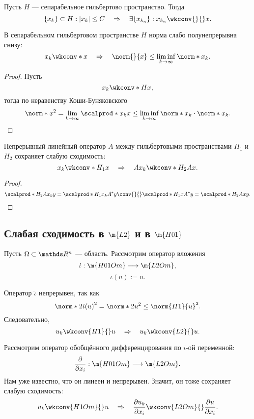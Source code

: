\begin{note} Пусть $H$ --- сепарабельное гильбертово пространство. Тогда
$$ \{ x_k \} \subset H : |x_k| \leq C \quad \Rightarrow \quad \exists \{ x_{k_n} \} : x_{k_n} \wkconv{}{} x.$$
\end{note}

\begin{note} В сепарабельном гильбертовом пространстве $H$ норма слабо полунепрерывна снизу:
$$x_k \wkconv*{}{} x \quad \Rightarrow \quad \norm{}{x} \leq \liminf_{k \to \infty} \norm*{}{x_k}.$$
\end{note}
\begin{proof}
Пусть 
$$ x_k \wkconv*{H}{} x,$$
тогда по неравенству Коши-Буняковского
$$ \norm*{}{x}^2 = \lim_{k \to \infty} \scalprod*{}{x_k}{x} \leq \liminf_{k \to \infty} \norm*{}{x_k} \cdot \norm*{}{x_k}.$$
\end{proof}


\begin{note} Непрерывный линейный оператор $A$ между гильбертовыми пространствами $H_1$ и $H_2$  сохраняет слабую сходимость:
$$ x_k \wkconv*{H_1}{} x \quad \Rightarrow \quad Ax_k \wkconv*{H_2}{} Ax.$$
\end{note}
\begin{proof}
$$ \scalprod*{H_2}{A x_k} {y} = \scalprod*{H_1}{x_k}{A^*y} \conv{}{} \scalprod*{H_1}{x}{A^*y} = \scalprod*{H_2}{Ax}{y}.$$

\end{proof}

\subsection{Слабая сходимость в $\m{L2}$ и в $\m{H01}$}
Пусть $\Omega \subset \real^n$ --- область. Рассмотрим оператор вложения
$$\dot{\iota} : \m{H01Om} \longrightarrow \m{L2Om},$$
$$\dot{\iota}(u) := u.$$

Оператор $\dot{\iota}$ непрерывен, так как
$$ \norm*{2}{\dot{\iota}(u)}^2 = \norm*{2}{u}^2 \leq \norm{H1}{u}^2.$$
Следовательно,
$$ u_k \wkconv{H1}{} u \quad \Rightarrow \quad u_k \wkconv{L2}{} u.$$

Рассмотрим оператор обобщённого дифференцирования по $i$-ой переменной:
$$ \pder{x_i} : \m{H01Om} \longrightarrow \m{L2Om}.$$
Нам уже известно, что он линеен и непрерывен. Значит, он тоже сохраняет слабую сходимость:
$$ u_k \wkconv{H1Om}{} u \quad \Rightarrow \quad \pder[u_k]{x_i} \wkconv{L2Om}{} \pder[u]{x_i}.$$

